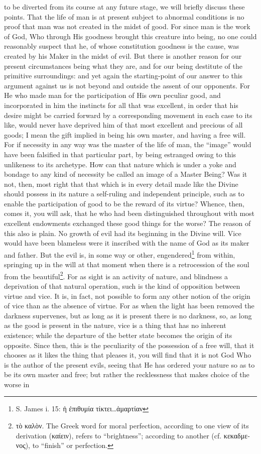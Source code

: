 to be diverted from its course at any future stage, we will briefly discuss these points. That the life of man is at present subject to abnormal conditions is no proof that man was not created in the midst of good. For since man is the work of God, Who through His goodness brought this creature into being, no one could reasonably suspect that he, of whose constitution goodness is the cause, was created by his Maker in the midst of evil. But there is another reason for our present circumstances being what they are, and for our being destitute of the primitive surroundings: and yet again the starting-point of our answer to this argument against us is not beyond and outside the assent of our opponents. For He who made man for the participation of His own peculiar good, and incorporated in him the instincts for all that was excellent, in order that his desire might be carried forward by a corresponding movement in each case to its like, would never have deprived him of that most excellent and precious of all goods; I mean the gift implied in being his own master, and having a free will. For if necessity in any way was the master of the life of man, the “image” would have been falsified in that particular part, by being estranged owing to this unlikeness to its archetype. How can that nature which is under a yoke and bondage to any kind of necessity be called an image of a Master Being? Was it not, then, most right that that which is in every detail made like the Divine should possess in its nature a self-ruling and independent principle, such as to enable the participation of good to be the reward of its virtue? Whence, then, comes it, you will ask, that he who had been distinguished throughout with most excellent endowments exchanged these good things for the worse? The reason of this also is plain. No growth of evil had its beginning in the Divine will. Vice would have been blameless were it inscribed with the name of God as its maker and father. But the evil is, in some way or other, engendered\footnote{S. James i. 15: \textgreek{ἡ ἐπιθυμία τίκτει}…\textgreek{ἁμαρτίαν}} from within, springing up in the will at that moment when there is a retrocession of the soul from the beautiful\footnote{\textgreek{τὸ καλὸν}. The Greek word for moral perfection, according to one view of its derivation (\textgreek{καίειν}), refers to “brightness”; according to another (cf. \textgreek{κεκαδμενος}), to “finish” or perfection.}. For as sight is an activity of nature, and blindness a deprivation of that natural operation, such is the kind of opposition between virtue and vice. It is, in fact, not possible to form any other notion of the origin of vice than as the absence of virtue. For as when the light has been removed the darkness supervenes, but as long as it is present there is no darkness, so, as long as the good is present in the nature, vice is a thing that has no inherent existence; while the departure of the better state becomes the origin of its opposite. Since then, this is the peculiarity of the possession of a free will, that it chooses as it likes the thing that pleases it, you will find that it is not God Who is the author of the present evils, seeing that He has ordered your nature so as to be its own master and free; but rather the recklessness that makes choice of the worse in 